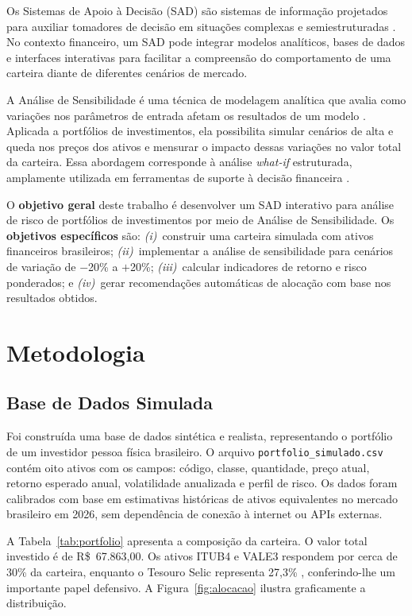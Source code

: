 \documentclass[12pt]{article}
\begin{document}
Os Sistemas de Apoio à Decisão (SAD) são sistemas de informação projetados para
auxiliar tomadores de decisão em situações complexas e semiestruturadas \cite{power2002}.
No contexto financeiro, um SAD pode integrar modelos analíticos, bases de dados e
interfaces interativas para facilitar a compreensão do comportamento de uma carteira
diante de diferentes cenários de mercado.

A Análise de Sensibilidade é uma técnica de modelagem analítica que avalia como
variações nos parâmetros de entrada afetam os resultados de um modelo \cite{saltelli2008}.
Aplicada a portfólios de investimentos, ela possibilita simular cenários de alta e queda
nos preços dos ativos e mensurar o impacto dessas variações no valor total da carteira.
Essa abordagem corresponde à análise \textit{what-if} estruturada, amplamente utilizada
em ferramentas de suporte à decisão financeira \cite{damodaran2012}.

O \textbf{objetivo geral} deste trabalho é desenvolver um SAD interativo para análise
de risco de portfólios de investimentos por meio de Análise de Sensibilidade.
Os \textbf{objetivos específicos} são: \textit{(i)}~construir uma carteira simulada com
ativos financeiros brasileiros; \textit{(ii)}~implementar a análise de sensibilidade
para cenários de variação de $-$20\% a $+$20\%; \textit{(iii)}~calcular indicadores
de retorno e risco ponderados; e \textit{(iv)}~gerar recomendações automáticas de
alocação com base nos resultados obtidos.

\section{Metodologia}

\subsection{Base de Dados Simulada}

Foi construída uma base de dados sintética e realista, representando o portfólio de um
investidor pessoa física brasileiro. O arquivo \texttt{portfolio\_simulado.csv} contém
oito ativos com os campos: código, classe, quantidade, preço atual, retorno esperado
anual, volatilidade anualizada e perfil de risco. Os dados foram calibrados com base em
estimativas históricas de ativos equivalentes no mercado brasileiro em 2026, sem
dependência de conexão à internet ou APIs externas.

A Tabela~\ref{tab:portfolio} apresenta a composição da carteira. O valor total
investido é de R\$~67.863,00. Os ativos ITUB4 e VALE3 respondem por cerca de 30\% da
carteira, enquanto o Tesouro Selic representa 27,3\% , conferindo-lhe um importante
papel defensivo. A Figura~\ref{fig:alocacao} ilustra graficamente a distribuição.
\end{document}
